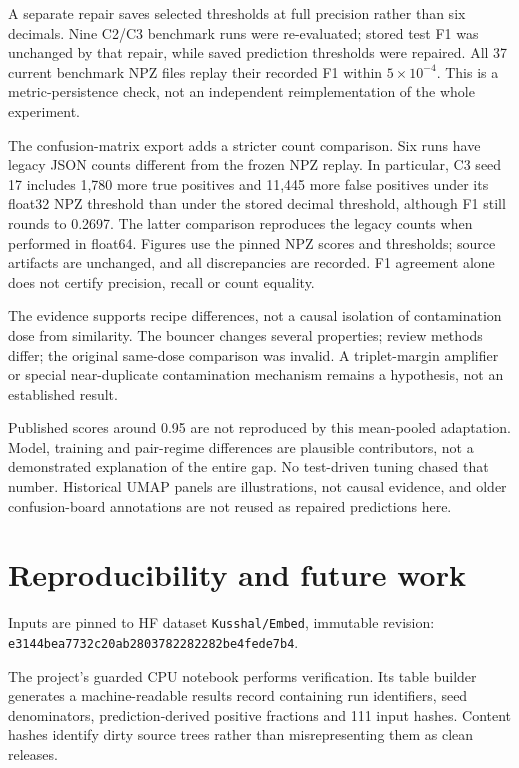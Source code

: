 \documentclass[conference]{IEEEtran}
\begin{document}
A separate repair saves selected thresholds at full precision rather than six
decimals. Nine C2/C3 benchmark runs were re-evaluated; stored test F1 was
unchanged by that repair, while saved prediction thresholds were repaired.
All 37 current benchmark NPZ files replay their recorded F1 within
$5\times10^{-4}$. This is a metric-persistence check, not an independent
reimplementation of the whole experiment.

The confusion-matrix export adds a stricter count comparison. Six runs have
legacy JSON counts different from the frozen NPZ replay. In particular, C3
seed 17 includes 1,780 more true positives and 11,445 more false positives
under its float32 NPZ threshold than under the stored decimal threshold,
although F1 still rounds to 0.2697. The latter comparison reproduces the legacy
counts when performed in float64. Figures use the pinned NPZ scores and
thresholds; source artifacts are unchanged, and all discrepancies are recorded.
F1 agreement alone does not certify precision, recall or count equality.

The evidence supports recipe differences, not a causal isolation of
contamination dose from similarity. The bouncer changes several properties;
review methods differ; the original same-dose comparison was invalid.
A triplet-margin amplifier or special near-duplicate contamination mechanism
remains a hypothesis, not an established result.

Published scores around 0.95 are not reproduced by this mean-pooled adaptation.
Model, training and pair-regime differences are plausible contributors, not a
demonstrated explanation of the entire gap. No test-driven tuning chased that
number. Historical UMAP panels are illustrations, not causal evidence, and
older confusion-board annotations are not reused as repaired predictions here.

\section{Reproducibility and future work}
Inputs are pinned to HF dataset \texttt{Kusshal/Embed}, immutable revision:\\
\texttt{e3144bea7732c20ab2803782282282be4fede7b4}.

The project's guarded CPU notebook performs verification. Its table builder
generates a machine-readable results record containing run identifiers, seed
denominators, prediction-derived positive fractions and 111 input hashes.
Content hashes identify dirty source trees rather than misrepresenting them
as clean releases.
\end{document}
